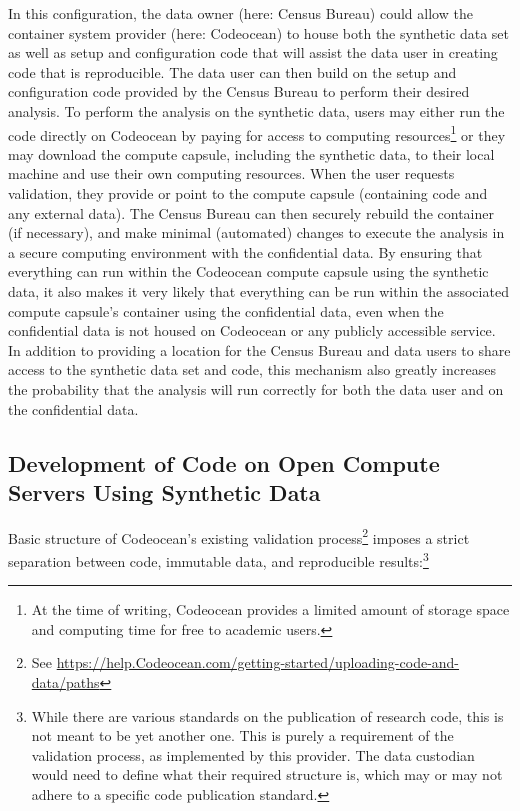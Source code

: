 \documentclass[inline]{hdsr}
\begin{document}
In this configuration, the data owner (here: Census Bureau) could allow the container system provider (here: Codeocean) to house both the synthetic data set as well as
setup and configuration code that will assist the data user in creating code that is reproducible. The data
user can then build on the setup and configuration code provided by the Census Bureau to perform their
desired analysis. To perform the analysis on the synthetic data, users may either run the code directly on
Codeocean by paying for access to computing resources\footnote{At the time of writing, Codeocean  provides a limited amount of storage space and computing time for free to academic users.} or they may download the compute capsule, including the synthetic data, to their local
machine and use their own computing resources. When the user requests validation, they provide or point to the compute capsule (containing code and any external data). The Census Bureau can then securely rebuild the container (if necessary), and make minimal (automated) changes to execute the analysis in a
secure computing environment with the confidential data. By ensuring that everything can
run within the Codeocean compute capsule using the synthetic data, it also makes it very likely that everything can
be run within the associated compute capsule's container using the confidential data, even when the confidential data is not housed on Codeocean or any publicly accessible service.
In addition to providing a location for the Census Bureau and data users to share access to the synthetic
data set and code, this mechanism also greatly increases the probability that the analysis will run correctly for both the data user and on the
confidential data. 



\subsection{Development of Code on Open Compute Servers Using Synthetic Data}

Basic structure of Codeocean's existing validation process\footnote{See \url{https://help.Codeocean.com/getting-started/uploading-code-and-data/paths}} imposes a strict separation between code, immutable data, and reproducible results:\footnote{While there are various standards on the publication of research code, this is not meant to be yet another one. This is purely a requirement of the validation process, as implemented by this provider. The data custodian would need to define what their required structure is, which may or may not adhere to a specific code publication standard.}
\end{document}

